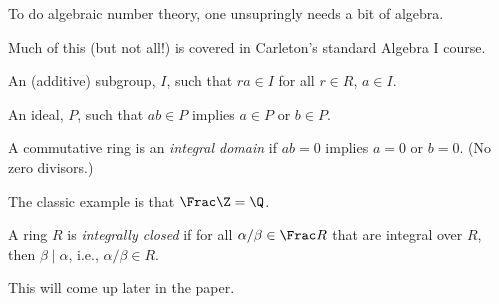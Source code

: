 To do algebraic number theory, one unsupringly needs a bit of algebra.

Much of this (but not all!) is covered in Carleton's standard Algebra I course.

\begin{definition}
\end{definition}

\begin{definition}[Ideal]
	An (additive) subgroup, $I$, such that $ra \in I$ for all $r \in R$, $a \in I$.
\end{definition}

\begin{definition}
	An ideal, $P$, such that $ab \in P$ implies $a \in P$ or $b \in P$.
\end{definition}



\begin{definition}
	A commutative ring is an \emph{integral domain} if $ab = 0$ implies $a = 0$ or $b = 0$. (No zero divisors.)
\end{definition}

\begin{definition}

\end{definition}


\begin{definition}
\end{definition}

The classic example is that $\Frac \Z = \Q$.

\begin{definition}
	A ring $R$ is \textit{integrally closed} if for all $\alpha / \beta \in \Frac R$ that are integral over $R$, then $\beta \mid \alpha$, i.e., $\alpha / \beta \in R$.

\end{definition}


This will come up later in the paper.


